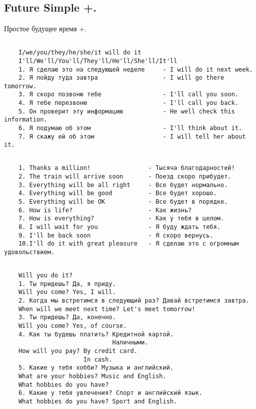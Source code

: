 \subsection{Future Simple +.}
Простое будущее время +.
\subsection*{}
\begin{verbatim}
    I/we/you/they/he/she/it will do it
    I'll/We'll/You'll/They'll/He'll/She'll/It'll
    1. Я сделаю это на следующей неделе     - I will do it next week.
    2. Я пойду туда завтра                  - I will go there tomorrow.
    3. Я скоро позвоню тебе                 - I'll call you soon.
    4. Я тебе перезвоню                     - I'll call you back.
    5. Он проверит эту информацию           - He well check this information.
    6. Я подумаю об этом                    - I'll think about it.
    7. Я скажу ей об этом                   - I will tell her about it.
\end{verbatim}

\subsection*{}
\begin{verbatim}
    1. Thanks a million!                - Тысяча благодарностей!
    2. The train will arrive soon       - Поезд скоро прибудет.
    3. Everything will be all right     - Все будет нормально.
    4. Everything will be good          - Все будет хорошо.
    5. Everything will be OK            - Все будет в порядке.
    6. How is life?                     - Как жизнь?
    7. How is everything?               - Как у тебя в целом.
    8. I will wait for you              - Я буду ждать тебя.
    9. I'll be back soon                - Я скоро вернусь.
    10.I'll do it with great pleasure   - Я сделаю это с огромным удовольствием.
\end{verbatim}

\subsection*{}
\begin{verbatim}
    Will you do it?
    1. Ты придешь? Да, я приду.
    Will you come? Yes, I will.
    2. Когда мы встретимся в следующий раз? Давай встретимся завтра.
    When will we meet next time? Let's meet tomorrow!
    3. Ты придешь? Да, конечно.
    Will you come? Yes, of course.
    4. Как ты будешь платить? Кредитной картой.
                              Наличными.
    How will you pay? By credit card.
                      In cash.
    5. Какие у тебя хобби? Музыка и английский.
    What are your hobbies? Music and English.
    What hobbies do you have?
    6. Какие у тебя увлечения? Спорт и английский язык.
    What hobbies do you have? Sport and English.
\end{verbatim}

